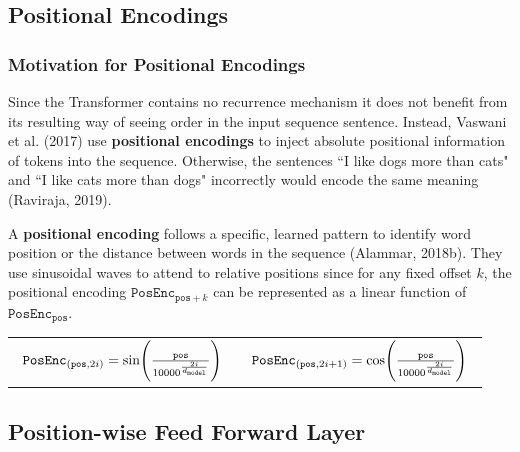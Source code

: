 \subsection{Positional Encodings} \label{sec:PosEncodings}

\subsubsection{Motivation for Positional Encodings}

Since the Transformer contains no recurrence mechanism it does not benefit from its resulting way of seeing order in the input sequence sentence. Instead, Vaswani et al. (2017) use \textbf{positional encodings} to inject absolute positional information of tokens into the sequence. Otherwise, the sentences ``I like dogs more than cats" and ``I like cats more than dogs" incorrectly would encode the same meaning (Raviraja, 2019). 

A \textbf{positional encoding} follows a specific, learned pattern to identify word position or the distance between words in the sequence (Alammar, 2018b). They use sinusoidal waves to attend to relative positions since for any fixed offset $k$, the positional encoding $\texttt{PosEnc}_{\texttt{pos} + k}$ can be represented as a linear function of $\texttt{PosEnc}_{\texttt{pos}}$.

\vspace{-10pt}

\begin{center}
\begin{tabular}{ c  c }
$
\begin{array}{ll}
\texttt{PosEnc}_{\Large (\texttt{pos}, 2i)} = \text{sin} \Bigg(\frac {\texttt{pos}} {10000^{\Large \frac {2i} {d_{\texttt{model}}} } }  \Bigg)
\end{array}
$
&
$
\begin{array}{ll}
\texttt{PosEnc}_{\Large (\texttt{pos}, 2i + 1)} = \text{cos} \Bigg(\frac {\texttt{pos}} {10000^{\Large \frac {2i} {d_{\texttt{model}}} } }  \Bigg)
\end{array}
$
\end{tabular}
\end{center}



\subsection{Position-wise Feed Forward Layer} \label{sec:PositionwiseFFNLayers}

